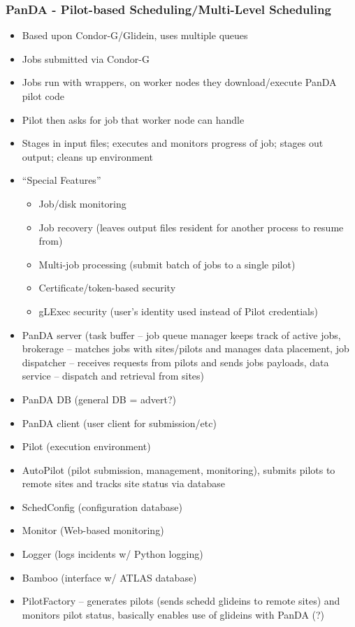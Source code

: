 \documentclass{sig-alternate}
\begin{document}
\subsubsection{PanDA - Pilot-based Scheduling/Multi-Level Scheduling}
\begin{itemize}
\item Based upon Condor-G/Glidein, uses multiple queues
\item Jobs submitted via Condor-G
\item Jobs run with wrappers, on worker nodes they download/execute PanDA pilot code
\item Pilot then asks for job that worker node can handle
\item Stages in input files; executes and monitors progress of job; stages out output;
  cleans up environment
\item ``Special Features''
  \begin{itemize}
  \item Job/disk monitoring
  \item Job recovery (leaves output files resident for another 
    process to resume from)
  \item Multi-job processing (submit batch of jobs to a single pilot)
  \item Certificate/token-based security
  \item gLExec security (user's identity used instead of Pilot credentials)
  \end{itemize}

\item PanDA server (task buffer -- job queue manager keeps track of
  active jobs, brokerage -- matches jobs  with sites/pilots and manages
  data placement, job dispatcher -- receives requests from pilots and sends
  jobs payloads, data service -- dispatch and retrieval from sites)
\item PanDA DB (general DB = advert?)
\item PanDA client (user client for submission/etc)
\item Pilot (execution environment)
\item AutoPilot (pilot submission, management, monitoring), submits
  pilots to remote sites and tracks site status via database
\item SchedConfig (configuration database)
\item Monitor (Web-based monitoring)
\item Logger (logs incidents w/ Python logging)
\item Bamboo (interface w/ ATLAS database)
\item PilotFactory -- generates pilots (sends schedd glideins to remote sites)
  and monitors pilot status, basically enables use of glideins with PanDA (?)
\end{itemize}
\end{document}
